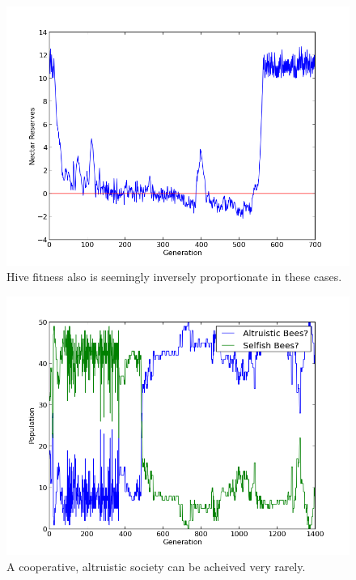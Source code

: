 \documentclass[11pt, letter]{article}
\begin{document}
                        \begin{figure}[tbph!]
				\begin{center}
					\includegraphics[scale=.5]{results/gossip_plot_twist_res.png}
				\end{center}
				\caption{Hive fitness also is seemingly inversely proportionate in these cases.}
				\label{fig:gossip_reserves}
			\end{figure}

			\begin{figure}[tbph!]
				\begin{center}
					\includegraphics[scale=.5]{results/gossip_alt_comp.png}
				\end{center}
				\caption{A cooperative, altruistic society can be acheived very rarely.}
				\label{fig:altruistic_composition}
			\end{figure}
\end{document}
